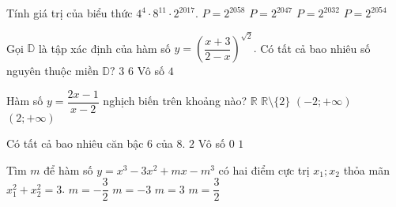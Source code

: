 \begin{ex}%
	Tính giá trị của biểu thức $4^4\cdot 8^{11}\cdot 2^{2017}.$
	\choice
	{\True $P=2^{2058}$}
	{$P=2^{2047}$}
	{$P=2^{2032}$}
	{$P=2^{2054}$}
\end{ex}
\begin{ex}%
	Gọi $\mathbb{D}$ là tập xác định của hàm số $y=\left(\dfrac{x+3}{2-x} \right)^{\sqrt 2}.$ Có tất cả bao nhiêu số nguyên thuộc miền $\mathbb{D}?$
	\choice
	{$3$}
	{$6$}
	{Vô số}
	{\True $4$}
\end{ex}
\begin{ex}%
	Hàm số $y=\dfrac{2x-1}{x-2}$ nghịch biến trên khoảng nào?
	\choice
	{$\mathbb{R}$}
	{$\mathbb{R}\setminus \{2\}$}
	{$(-2;+\infty)$}
	{\True$(2;+\infty)$}
\end{ex}
\begin{ex}%
	Có tất cả bao nhiêu căn bậc $6$ của $8.$
	\choice
	{\True $2$}
	{Vô số}
	{$0$}
	{$1$}
\end{ex}

\begin{ex}%
Tìm $m$ để hàm số $y = x^3 - 3x^2 + mx - m^3$ có hai điểm cực trị $x_1;x_2$ thỏa mãn $x_1^2 + x_2^2 = 3$.
\choice
{$m=-\dfrac{3}{2}$}
{$m = -3$}
{$m = 3$}
{\True $m = \dfrac{3}{2}$}
\end{ex}

